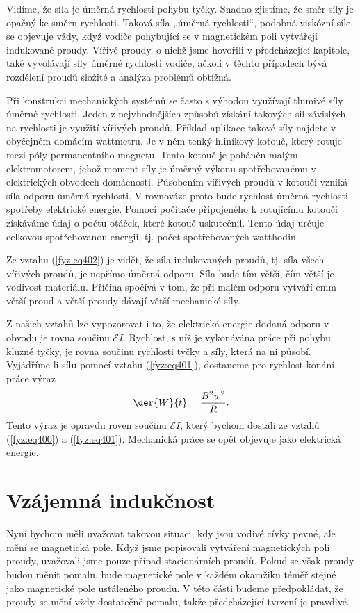   Vidíme, že síla je úměrná rychlosti pohybu tyčky. Snadno zjistíme, že směr síly je opačný ke 
  směru rychlosti. Taková síla „úměrná rychlosti“, podobná viskózní síle, se objevuje vždy, když 
  vodiče pohybující se v magnetickém poli vytvářejí indukované proudy. Vířivé proudy, o nichž jsme 
  hovořili v předcházející kapitole, také vyvolávají síly úměrné rychlosti vodiče, ačkoli v těchto 
  případech bývá rozdělení proudů složité a analýza problémů obtížná. 
  
  Při konstrukci mechanických systémů se často s výhodou využívají tlumivé síly úměrné rychlosti. 
  Jeden z nejvhodnějších způsobů získání takových sil závislých na rychlosti je využití vířivých 
  proudů. Příklad aplikace takové síly najdete v obyčejném domácím wattmetru. Je v něm tenký 
  hliníkový kotouč, který rotuje mezi póly permanentního magnetu. Tento kotouč je poháněn malým 
  elektromotorem, jehož moment síly je úměrný výkonu spotřebovanému v elektrických obvodech 
  domácnosti. Působením vířivých proudů v kotouči vzniká síla odporu úměrná rychlosti. V rovnováze 
  proto bude rychlost úměrná rychlosti spotřeby elektrické energie. Pomocí počítače připojeného k 
  rotujícímu kotouči získáváme údaj o počtu otáček, které kotouč uskutečnil. Tento údaj určuje 
  celkovou spotřebovanou energii, tj. počet spotřebovaných watthodin. 
  
  Ze vztahu (\ref{fyz:eq402}) je vidět, že síla indukovaných proudů, tj. síla všech vířivých 
  proudů, je nepřímo úměrná odporu. Síla bude tím větší, čím větší je vodivost materiálu. Příčina 
  spočívá v tom, že při malém odporu vytváří emm větší proud a větší proudy dávají větší mechanické 
  síly. 
  
  Z našich vztahů lze vypozorovat i to, že elektrická energie dodaná odporu v obvodu je rovna 
  součinu \(\mathscr{E}I\). Rychlost, s níž je vykonávána práce při pohybu kluzné tyčky, je rovna 
  součinu rychlosti tyčky a síly, která na ni působí. Vyjádříme-li sílu pomocí vztahu 
  (\ref{fyz:eq401}), dostaneme pro rychlost konání práce výraz
  \begin{equation}\label{fyz:eq403}
    \der{W}{t} = \frac{B^2w^2}{R}.
  \end{equation}  
  Tento výraz je opravdu roven součinu \(\mathscr{E}I\), který bychom dostali ze vztahů 
  (\ref{fyz:eq400}) a (\ref{fyz:eq401}). Mechanická práce se opět objevuje jako elektrická energie.
  
\section{Vzájemná indukčnost}\label{fyz:IIchapXVIIsecVI}
  Nyní bychom měli uvažovat takovou situaci, kdy jsou vodivé cívky pevné, ale mění se magnetická 
  pole. Když jsme popisovali vytváření magnetických polí proudy, uvažovali jsme pouze případ 
  stacionárních proudů. Pokud se však proudy budou měnit pomalu, bude magnetické pole v každém 
  okamžiku téměř stejné jako magnetické pole ustáleného proudu. V této části budeme předpokládat, 
  že proudy se mění vždy dostatečně pomalu, takže předcházející tvrzení je pravdivé.
  
